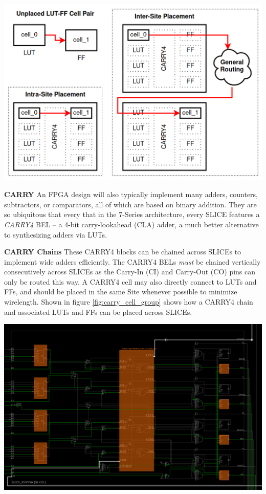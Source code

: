 \documentclass{article}
\begin{document}
\begin{multicols}{2}
        {
            \centering
            \includegraphics[width=\columnwidth]{figures/intersite_intrasite_2.png}
            \label{fig:intersite_intrasite}
        }


    \newpage
    \textbf{CARRY} \quad
        An FPGA design will also typically implement many adders, counters, subtractors, or comparators, all of which are based on binary addition. 
        They are so ubiquitous that every that in the 7-Series architecture, every SLICE features a \emph{CARRY4} BEL -- a 4-bit carry-lookahead (CLA) adder, a much better alternative to synthesizing adders via LUTs. 

    \textbf{CARRY Chains} \quad
        These CARRY4 blocks can be chained across SLICEs to implement wide adders efficiently. 
        The CARRY4 BELs \emph{must} be chained vertically consecutively across SLICEs as the Carry-In (CI) and Carry-Out (CO) pins can only be routed this way. 
        A CARRY4 cell may also directly connect to LUTs and FFs, and should be placed in the same Site whenever possible to minimize wirelength. 
        Shown in figure \ref{fig:carry_cell_group} shows how a CARRY4 chain and associated LUTs and FFs can be placed across SLICEs. 


        {
            \centering
            \includegraphics[width=\columnwidth]{figures/carry_cell_group.png}
            \label{fig:carry_cell_group}
        }


\end{multicols}
\end{document}
